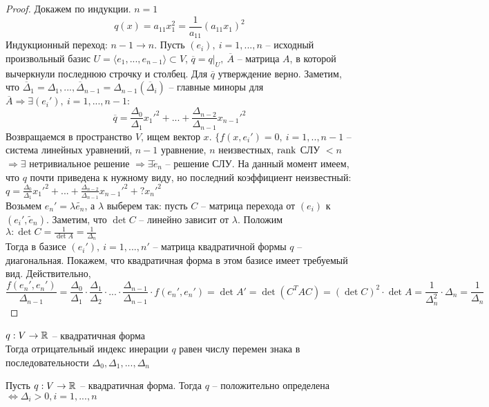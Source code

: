 \begin{proof}
	Докажем по индукции. $n=1$
	\[q(x) = a_{11} x^2_1 = \frac{1}{a_{11}} (a_{11}x_1)^2\]
	Индукционный переход: $n-1 \to n$.
	Пусть $(e_i), \ i = 1, ..., n$ -- исходный произвольный базис $U = \langle e_1, ..., e_{n-1}\rangle \subset V$, 
	$\overline{q} = q \big|_U, \ \overline{A}$ -- матрица $A$, в которой вычеркнули последнюю строчку и столбец.
	Для $\overline{q}$ утверждение верно. 
	Заметим, что $\overline{\Delta}_1 = \Delta_1, ..., \overline{\Delta}_{n-1} = \Delta_{n-1} (\overline{\Delta}_i)$ -- главные миноры для $\overline{A} \Rightarrow
	\exists (e_i'), \ i = 1, ..., n-1:$
	\[\overline{q} = \frac{\Delta_0}{\Delta_1} x_1'^2 + ... + \frac{\Delta_{n-2}}{\Delta_{n-1}} x_{n-1}'^2\]
	Возвращаемся в пространство $V$, ищем вектор $x$. $\{ f(x, e_i') = 0, \ i = 1,..,n-1$ -- система линейных уравнений, $n-1$ уравнение, $n$ неизвестных,
	$\operatorname{rank}$ СЛУ $< n$ $\Rightarrow \exists$ нетривиальное решение $\Rightarrow \exists \widetilde{e}_n$ -- решение СЛУ. 
	На данный момент имеем, что $q$ почти приведена к нужному виду, но последний коэффициент неизвестный: 
	$q = \frac{\Delta_0}{\Delta_1} x_1'^2 + ... + \frac{\Delta_{n-2}}{\Delta_{n-1}} x_{n-1}'^2 + ? x_n'^2$\\
	Возьмем $e_n' = \lambda \widetilde{e_n}$, а $\lambda$ выберем так: пусть $C$ -- матрица перехода от $(e_i)$  
	к $(e_i', \widetilde{e}_n)$. Заметим, что $\det C$ -- линейно зависит от $\lambda$.
	Положим $\lambda: \det C = \frac{1}{\det A} = \frac{1}{\Delta_n}$\\
	Тогда в базисе $(e_i'), \ i = 1, ..., n'$ -- матрица квадратичной формы $q$ -- диагональная. Покажем, что квадратичная форма в этом базисе имеет требуемый вид. Действительно,
	\[\frac{f(e_n', e_n')}{\Delta_{n-1}} = \frac{\Delta_0}{\Delta_1} \cdot \frac{\Delta_1}{\Delta_2} \cdot ... \cdot \frac{\Delta_{n-1}}{\Delta_{n-1}} \cdot f(e_n', e_n') = 
	\det A' = \det (C^TAC) = (\det C)^2 \cdot \det A = \frac{1}{\Delta^2_n} \cdot \Delta_n = \frac{1}{\Delta_n}\]
\end{proof}

\begin{Cons}
	$q: V \to \mathbb{R}$ -- квадратичная форма\\
	Тогда отрицательный индекс инерации $q$ равен числу перемен знака в последовательности $\Delta_0, \Delta_1, ..., \Delta_n$ 
\end{Cons}

\begin{Thm} 
	Пусть $q: V \to \mathbb{R}$ -- квадратичная форма. Тогда
	$q$ -- положительно  определена $\Leftrightarrow \Delta_i > 0, i = 1,...,n$
\end{Thm} 

